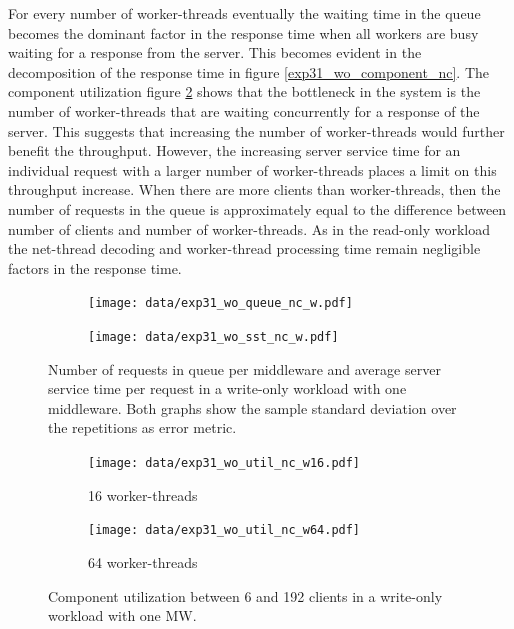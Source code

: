 \documentclass[report.tex]{subfiles}
\begin{document}
For every number of worker-threads eventually the waiting time in the queue becomes the dominant factor in the response time when all workers are busy waiting for a response from the server. This becomes evident in the decomposition of the response time in figure \ref{exp31_wo_component_nc}.
The component utilization figure \ref{exp31_wo_util} shows that the bottleneck in the system is the number of worker-threads that are waiting concurrently for a response of the server. This suggests that increasing the number of worker-threads would further benefit the throughput. However, the increasing server service time for an individual request with a larger number of worker-threads places a limit on this throughput increase.
When there are more clients than worker-threads, then the number of requests in the queue is approximately equal to the difference between number of clients and number of worker-threads.
As in the read-only workload the net-thread decoding and worker-thread processing time remain negligible factors in the response time.




\begin{figure}[H]
	\begin{subfigure}[b]{.499\linewidth}
		\centering
		\texttt{[image: data/exp31\_wo\_queue\_nc\_w.pdf]}
	\end{subfigure}\hfill
	\begin{subfigure}[b]{.499\linewidth}
		\centering
		\texttt{[image: data/exp31\_wo\_sst\_nc\_w.pdf]}
	\end{subfigure}\hfill
	\caption{Number of requests in queue per middleware and average server service time per request in a write-only workload with one middleware. Both graphs show the sample standard deviation over the repetitions as error metric.}\label{exp31_wo_queue_sst_nc}
\end{figure}

\begin{figure}[H]
	\begin{subfigure}[b]{.499\linewidth}
		\centering
		\texttt{[image: data/exp31\_wo\_util\_nc\_w16.pdf]}
		\caption{16 worker-threads}
	\end{subfigure}\hfill
	\begin{subfigure}[b]{.499\linewidth}
		\centering
		\texttt{[image: data/exp31\_wo\_util\_nc\_w64.pdf]}
		\caption{64 worker-threads}
	\end{subfigure}\hfill
	\caption{Component utilization between 6 and 192 clients in a write-only workload with one MW.}\label{exp31_wo_util}
\end{figure}
\end{document}
